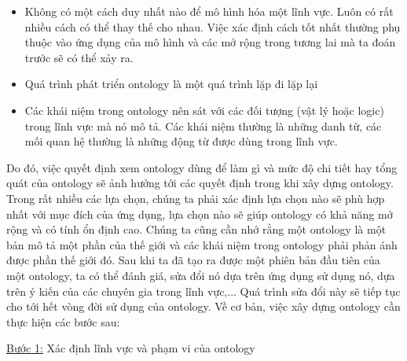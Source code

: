 \begin{itemize}
	\item Không có một cách duy nhất nào để mô hình hóa một lĩnh vực. Luôn có rất nhiều cách có thể thay thế cho nhau. Việc xác định cách tốt nhất thường phụ thuộc vào ứng dụng của mô hình và các mở rộng trong tương lai mà ta đoán trước sẽ có thể xảy ra.
	\item Quá trình phát triển ontology là một quá trình lặp đi lặp lại
	\item Các khái niệm trong ontology nên sát với các đối tượng (vật lý hoặc logic) trong lĩnh vực mà nó mô tả. Các khái niệm thường là những danh từ, các mối quan hệ thường là những động từ được dùng trong lĩnh vực.
\end{itemize}
Do đó, việc quyết định xem ontology dùng để làm gì và mức độ chi tiết hay tổng quát của ontology sẽ ảnh hưởng tới các quyết định trong khi xây dựng ontology. Trong rất nhiều các lựa chọn, chúng ta phải xác định lựa chọn nào sẽ phù hợp nhất với mục đích của ứng dụng, lựa chọn nào sẽ giúp ontology có khả năng mở rộng và có tính ổn định cao. Chúng ta cũng cần nhớ rằng một ontology là một bản mô tả một phần của thế giới và các khái niệm trong ontology phải phản ánh được phần thế giới đó. Sau khi ta đã tạo ra được một phiên bản đầu tiên của một ontology, ta có thể đánh giá, sửa đổi nó dựa trên ứng dụng sử dụng nó,  dựa trên ý kiến của các chuyên gia trong lĩnh vực,... Quá trình sửa đổi này sẽ tiếp tục cho tới hết vòng đời sử dụng của ontology.
Về cơ bản, việc xây dựng ontology cần thực hiện các bước sau:

\underline{Bước 1:} Xác định lĩnh vực và phạm vi của ontology

